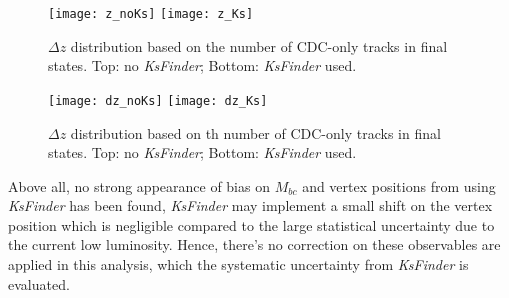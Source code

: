 \begin{figure}[htpb]
	\centering
	\texttt{[image: z\_noKs]}
	\texttt{[image: z\_Ks]}
	\caption{$\Delta z$ distribution based on the number of CDC-only tracks in final states. Top: no \textit{KsFinder}; Bottom: \textit{KsFinder} used.}
	\label{fig:bias-z}
\end{figure}
\begin{figure}[htpb]
	\centering
	\texttt{[image: dz\_noKs]}
	\texttt{[image: dz\_Ks]}
	\caption{$\Delta z$ distribution based on th number of CDC-only tracks in final states. Top: no \textit{KsFinder}; Bottom: \textit{KsFinder} used.}
	\label{fig:bias-zerr}
\end{figure}
Above all, no strong appearance of bias on $M_{bc}$ and vertex positions from using \textit{KsFinder} has been found, \textit{KsFinder} may implement a small shift on the vertex position which is negligible compared to the large statistical uncertainty due to the current low luminosity. Hence, there's no correction on these observables are applied in this analysis, which the systematic uncertainty from \textit{KsFinder} is evaluated.
